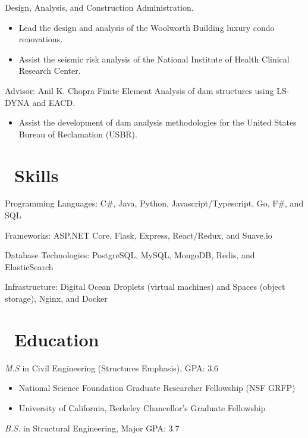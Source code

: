 \documentclass{resume}
\begin{document}
Design, Analysis, and Construction Administration.
\begin{itemize}
  \item Lead the design and analysis of the Woolworth Building
          luxury condo renovations. 
  \item Assist the seismic risk analysis of the National Institute of Health Clinical Research Center.
\end{itemize}

 {Advisor: Anil K. Chopra}
Finite Element Analysis of dam structures using LS-DYNA and EACD.
\begin{itemize}
  \item Assist the development of dam analysis methodologies for the United States Bureau of
          Reclamation (USBR).
\end{itemize}


\section{\faCogs\ Skills}

  Programming Languages: C\#, Java, Python, Javascript/Typescript, Go, F\#, and SQL

  Frameworks: ASP.NET Core, Flask, Express, React/Redux, and Suave.io
 
  Database Technologies: PostgreSQL, MySQL, MongoDB, Redis, and ElasticSearch
 
  Infrastructure: Digital Ocean Droplets (virtual machines) and Spaces (object storage), Nginx, and Docker


\section{\faGraduationCap\ Education}
\textit{M.S } in Civil Engineering (Structures Emphasis), GPA: 3.6

\begin{itemize}
 \item National Science Foundation Graduate Researcher Fellowship (NSF GRFP)
 \item University of California, Berkeley Chancellor's Graduate Fellowship
\end{itemize}

\textit{B.S.} in Structural Engineering, Major GPA: 3.7

%
%
\end{document}
